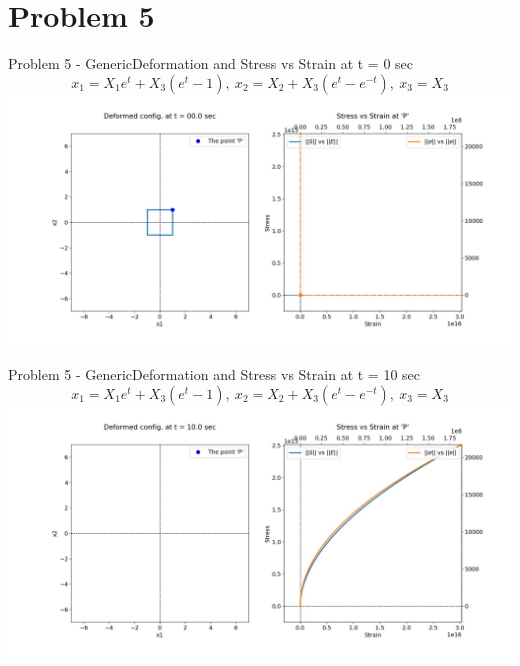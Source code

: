 \documentclass{beamer}
\begin{document}
\section{Problem 5}

\begin{frame}{Problem 5 - Generic}{Deformation and Stress vs Strain at t = 0 sec}
    \vspace{-1em}
    \scriptsize $$x_1 = X_1e^t + X_3(e^t-1),\ x_2 = X_2 + X_3(e^t-e^{-t}),\ x_3 = X_3$$
    \includegraphics[width=\textwidth, trim={4.5cm 2cm 3cm 1cm}, clip]{Plots/igeneric.jpg}
\end{frame}

\begin{frame}{Problem 5 - Generic}{Deformation and Stress vs Strain at t = 10 sec}
    \vspace{-1em}
    \scriptsize $$x_1 = X_1e^t + X_3(e^t-1),\ x_2 = X_2 + X_3(e^t-e^{-t}),\ x_3 = X_3$$
    \includegraphics[width=\textwidth, trim={4.5cm 2cm 3cm 1cm}, clip]{Plots/generic.jpg}
\end{frame}
\end{document}
